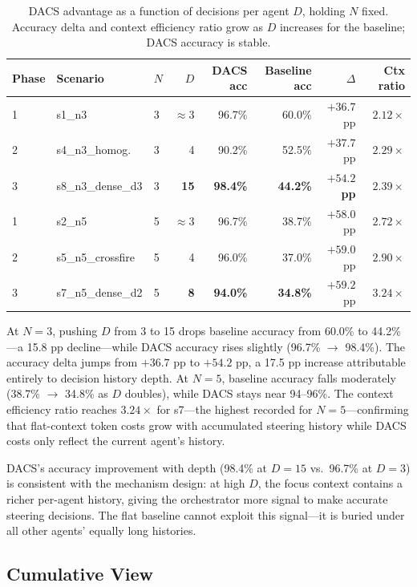 \documentclass{article}
\begin{document}
\begin{table}[h]
\caption{DACS advantage as a function of decisions per agent $D$,
holding $N$ fixed. Accuracy delta and context efficiency ratio grow
as $D$ increases for the baseline; DACS accuracy is stable.}
\label{tab:density}
\centering
\small
\begin{tabular}{lllrrrrr}
\toprule
Phase & Scenario & $N$ & $D$ & DACS acc & Baseline acc & $\Delta$ & Ctx ratio \\
\midrule
1 & s1\_n3           & 3 & $\approx 3$ & 96.7\% & 60.0\% & $+36.7$pp & $2.12\times$ \\
2 & s4\_n3\_homog.   & 3 & 4           & 90.2\% & 52.5\% & $+37.7$pp & $2.29\times$ \\
3 & s8\_n3\_dense\_d3 & 3 & \textbf{15} & \textbf{98.4\%} & \textbf{44.2\%} & $\mathbf{+54.2}$\textbf{pp} & $2.39\times$ \\
\midrule
1 & s2\_n5           & 5 & $\approx 3$ & 96.7\% & 38.7\% & $+58.0$pp & $2.72\times$ \\
2 & s5\_n5\_crossfire & 5 & 4           & 96.0\% & 37.0\% & $+59.0$pp & $2.90\times$ \\
3 & s7\_n5\_dense\_d2 & 5 & \textbf{8}  & \textbf{94.0\%} & \textbf{34.8\%} & $+59.2$pp & $\mathbf{3.24\times}$ \\
\bottomrule
\end{tabular}
\end{table}

At $N=3$, pushing $D$ from 3 to 15 drops baseline accuracy from 60.0\%
to 44.2\%---a 15.8 pp decline---while DACS accuracy rises slightly
(96.7\% $\to$ 98.4\%).
The accuracy delta jumps from $+36.7$ pp to $+54.2$ pp, a 17.5 pp
increase attributable entirely to decision history depth.
At $N=5$, baseline accuracy falls moderately (38.7\% $\to$ 34.8\% as
$D$ doubles), while DACS stays near 94--96\%.
The context efficiency ratio reaches $3.24\times$ for s7---the highest
recorded for $N=5$---confirming that flat-context token costs grow with
accumulated steering history while DACS costs only reflect the current
agent's history.

DACS's accuracy improvement with depth (98.4\% at $D=15$ vs.\ 96.7\%
at $D=3$) is consistent with the mechanism design: at high $D$, the
focus context contains a richer per-agent history, giving the
orchestrator more signal to make accurate steering decisions.
The flat baseline cannot exploit this signal---it is buried under all
other agents' equally long histories.

\subsection{Cumulative View}
\end{document}
